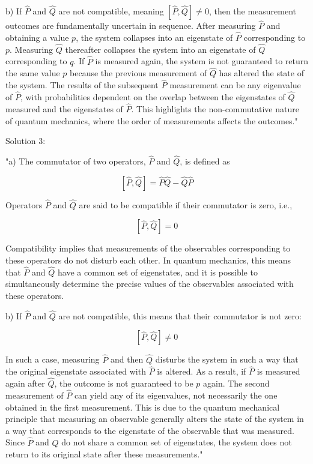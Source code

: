 b) If \( \hat{P} \) and \( \hat{Q} \) are not compatible, meaning \([ \hat{P}, \hat{Q} ] \neq 0\), then the measurement outcomes are fundamentally uncertain in sequence. After measuring \( \hat{P} \) and obtaining a value \( p \), the system collapses into an eigenstate of \( \hat{P} \) corresponding to \( p \). Measuring \( \hat{Q} \) thereafter collapses the system into an eigenstate of \( \hat{Q} \) corresponding to \( q \). If \( \hat{P} \) is measured again, the system is not guaranteed to return the same value \( p \) because the previous measurement of \( \hat{Q} \) has altered the state of the system. The results of the subsequent \( \hat{P} \) measurement can be any eigenvalue of \( \hat{P} \), with probabilities dependent on the overlap between the eigenstates of \( \hat{Q} \) measured and the eigenstates of \( \hat{P} \). This highlights the non-commutative nature of quantum mechanics, where the order of measurements affects the outcomes."

Solution 3:

"a) The commutator of two operators, \( \hat{P} \) and \( \hat{Q} \), is defined as

\[ [\hat{P}, \hat{Q}] = \hat{P}\hat{Q} - \hat{Q}\hat{P} \]

Operators \( \hat{P} \) and \( \hat{Q} \) are said to be compatible if their commutator is zero, i.e., 

\[ [\hat{P}, \hat{Q}] = 0 \]

Compatibility implies that measurements of the observables corresponding to these operators do not disturb each other. In quantum mechanics, this means that \( \hat{P} \) and \( \hat{Q} \) have a common set of eigenstates, and it is possible to simultaneously determine the precise values of the observables associated with these operators.

b) If \( \hat{P} \) and \( \hat{Q} \) are not compatible, this means that their commutator is not zero:

\[ [\hat{P}, \hat{Q}] \neq 0 \]

In such a case, measuring \( \hat{P} \) and then \( \hat{Q} \) disturbs the system in such a way that the original eigenstate associated with \( \hat{P} \) is altered. As a result, if \( \hat{P} \) is measured again after \( \hat{Q} \), the outcome is not guaranteed to be \( p \) again. The second measurement of \( \hat{P} \) can yield any of its eigenvalues, not necessarily the one obtained in the first measurement. This is due to the quantum mechanical principle that measuring an observable generally alters the state of the system in a way that corresponds to the eigenstate of the observable that was measured. Since \( \hat{P} \) and \( \hat{Q} \) do not share a common set of eigenstates, the system does not return to its original state after these measurements."



